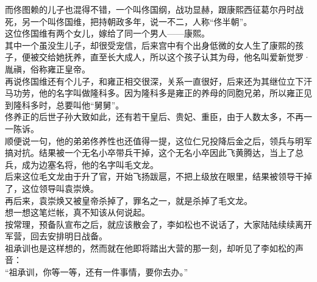 \begin{multicols}{\theparacolNo}
而佟图赖的儿子也混得不错，一个叫佟国纲，战功显赫，跟康熙西征葛尔丹时战死，另一个叫佟国维，把持朝政多年，说一不二，人称“佟半朝”。\\

这位佟国维有两个女儿，嫁给了同一个男人——康熙。\\

其中一个虽没生儿子，却很受宠信，后来宫中有个出身低微的女人生了康熙的孩子，便被交给她抚养，直至长大成人，所以这个孩子认其为母，他名叫爱新觉罗·胤禛，俗称雍正皇帝。\\

再说佟国维还有个儿子，和雍正相交很深，关系一直很好，后来还为其继位立下汗马功劳，他的名字叫做隆科多。因为隆科多是雍正的养母的同胞兄弟，所以雍正见到隆科多时，总要叫他“舅舅”。\\

佟养正的后世子孙大致如此，还有若干皇后、贵妃、重臣，由于人数太多，不再一一陈诉。\\

顺便说一句，他的弟弟佟养性也还值得一提，这位仁兄投降后金之后，领兵与明军搞对抗。结果被一个无名小卒带兵干掉，这个无名小卒因此飞黄腾达，当上了总兵，成为边塞名将，他的名字叫毛文龙。\\

后来这位毛文龙由于升了官，开始飞扬跋扈，不把上级放在眼里，结果被领导干掉了，这位领导叫袁崇焕。\\

再后来，袁崇焕又被皇帝杀掉了，罪名之一，就是杀掉了毛文龙。\\

想一想这笔烂帐，真不知该从何说起。\\

按常理，预备队宣布之后，就应该散会了，李如松也不说话了，大家陆陆续续离开军营，回去安排明日战备。\\

祖承训也是这样想的，然而就在他即将踏出大营的那一刻，却听见了李如松的声音：\\

“祖承训，你等一等，还有一件事情，要你去办。”\\

\ifnum{}
	\end{multicols}
\fi
\newpage

